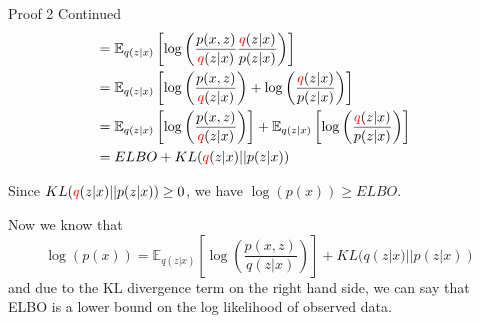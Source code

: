 \begin{frame}{Proof 2 Continued}
    \begin{align*}
        &= \mathbb{E}_{q(z|x)} \left[ \log\left( \frac{p(x,z)}{\textcolor{red}{q}(z|x)} \frac{\textcolor{red}{q}(z|x)}{p(z|x)} \right) \right] && \text{} \\
        &= \mathbb{E}_{q(z|x)} \left[ \log\left( \frac{p(x,z)}{\textcolor{red}{q}(z|x)} \right) + \log\left( \frac{\textcolor{red}{q}(z|x)}{p(z|x)} \right) \right] && \text{} \\
        &= \mathbb{E}_{q(z|x)} \left[ \log\left( \frac{p(x,z)}{\textcolor{red}{q}(z|x)} \right) \right] + \mathbb{E}_{q(z|x)} \left[ \log\left( \frac{\textcolor{red}{q}(z|x)}{p(z|x)} \right) \right] && \text{} \\
        &= ELBO + KL(\textcolor{red}{q}(z|x) || p(z|x)) && \text{} \\
    \end{align*}

    Since $KL(\textcolor{red}{q}(z|x) || p(z|x)) \geq 0$, we have $\log(p(x)) \geq ELBO$.
\end{frame}

\begin{frame}
    Now we know that 
    \[ \boxed{\log(p(x)) = \mathbb{E}_{q(z|x)} \left[ \log\left( \frac{p(x,z)}{q(z|x)} \right) \right] + KL(q(z|x) || p(z|x))} \]
    and due to the KL divergence term on the right hand side, we can say that ELBO is a lower bound on the log likelihood of observed data.
\end{frame}
